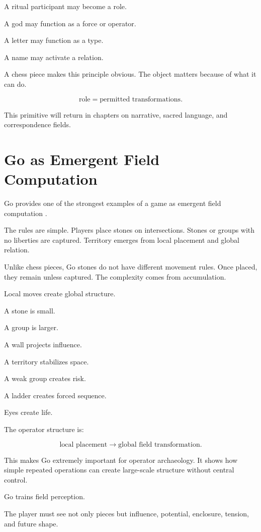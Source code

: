 \documentclass[11pt]{book}
\begin{document}
A ritual participant may become a role.

A god may function as a force or operator.

A letter may function as a type.

A name may activate a relation.

A chess piece makes this principle obvious. The object matters because of what it can do.

\[
\text{role} = \text{permitted transformations}.
\]

This primitive will return in chapters on narrative, sacred language, and correspondence fields.

\section{Go as Emergent Field Computation}

Go provides one of the strongest examples of a game as emergent field computation \cite{Murray1952BoardGames,Bell1969BoardTableGames}.

The rules are simple. Players place stones on intersections. Stones or groups with no liberties are captured. Territory emerges from local placement and global relation.

Unlike chess pieces, Go stones do not have different movement rules. Once placed, they remain unless captured. The complexity comes from accumulation.

Local moves create global structure.

A stone is small.

A group is larger.

A wall projects influence.

A territory stabilizes space.

A weak group creates risk.

A ladder creates forced sequence.

Eyes create life.

The operator structure is:

\[
\text{local placement} \rightarrow \text{global field transformation}.
\]

This makes Go extremely important for operator archaeology. It shows how simple repeated operations can create large-scale structure without central control.

Go trains field perception.

The player must see not only pieces but influence, potential, enclosure, tension, and future shape.
\end{document}
